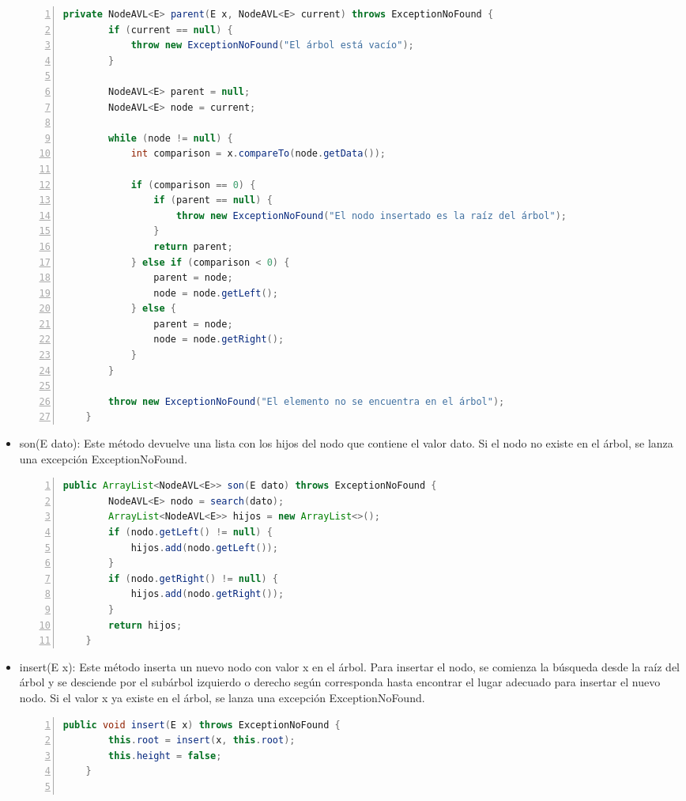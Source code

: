 \documentclass{article}
\begin{document}
\begin{itemize}
\begin{lstlisting}[language=Java, caption=Método parent(E x), numbers=left]
    private NodeAVL<E> parent(E x, NodeAVL<E> current) throws ExceptionNoFound {
        if (current == null) {
            throw new ExceptionNoFound("El árbol está vacío");
        }
    
        NodeAVL<E> parent = null;
        NodeAVL<E> node = current;
    
        while (node != null) {
            int comparison = x.compareTo(node.getData());
    
            if (comparison == 0) {
                if (parent == null) {
                    throw new ExceptionNoFound("El nodo insertado es la raíz del árbol");
                }
                return parent;
            } else if (comparison < 0) {
                parent = node;
                node = node.getLeft();
            } else {
                parent = node;
                node = node.getRight();
            }
        }
    
        throw new ExceptionNoFound("El elemento no se encuentra en el árbol");
    }
                            \end{lstlisting}
                    \item son(E dato): Este método devuelve una lista con los hijos del nodo que contiene el valor dato. Si el nodo no existe en el árbol, se lanza una excepción ExceptionNoFound.
                            \begin{lstlisting}[language=Java, caption=Método son(E dato), numbers=left]
    public ArrayList<NodeAVL<E>> son(E dato) throws ExceptionNoFound {
        NodeAVL<E> nodo = search(dato);
        ArrayList<NodeAVL<E>> hijos = new ArrayList<>();
        if (nodo.getLeft() != null) {
            hijos.add(nodo.getLeft());
        }
        if (nodo.getRight() != null) {
            hijos.add(nodo.getRight());
        }
        return hijos;
    }
                            \end{lstlisting}
                    \item insert(E x): Este método inserta un nuevo nodo con valor x en el árbol. Para insertar el nodo, se comienza la búsqueda desde la raíz del árbol y se desciende por el subárbol izquierdo o derecho según corresponda hasta encontrar el lugar adecuado para insertar el nuevo nodo. Si el valor x ya existe en el árbol, se lanza una excepción ExceptionNoFound.
                            \begin{lstlisting}[language=Java, caption=Método insert(E x), numbers=left]
    public void insert(E x) throws ExceptionNoFound {
        this.root = insert(x, this.root);
        this.height = false;
    }
    

\end{lstlisting}
\end{itemize}
\end{document}
